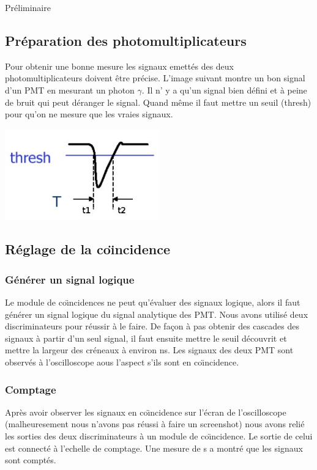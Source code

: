 \documentclass[a4paper,11pt,liststotocnumbered,bibtotocnumbered]{scrartcl}
\begin{document}
 \begin{section}{Préliminaire}
  \subsection{Préparation des photomultiplicateurs}
   Pour obtenir une bonne mesure les signaux emettés des deux photomultiplicateurs doivent être précise. L'image suivant montre un bon signal d'un PMT en mesurant un photon $\gamma$. Il n' y a qu'un signal bien défini et à peine de bruit qui peut déranger le signal. Quand même il faut mettre un seuil (thresh) pour qu'on ne mesure que les vraies signaux.  
   \begin{center}
    \includegraphics[width=0.5\textwidth]{bilder/pmtpuls.jpg}
   \end{center}
  

  \subsection{Réglage de la co\"{\i}ncidence}
   \subsubsection{Générer un signal logique}
    Le module de co\"{\i}ncidences ne peut qu'évaluer des signaux logique, alors il faut générer un signal logique du signal analytique des PMT. Nous avons utilisé deux discriminateurs pour réussir à le faire. De fa\c con à pas obtenir des cascades des signaux à partir d'un seul signal, il faut ensuite mettre le seuil découvrit et mettre la largeur des créneaux à environ \unit[600]{ns}. Les signaux des deux PMT sont observés à l'oscilloscope aous l'aspect s'ils sont en co\"{\i}ncidence.
   
  
   \subsubsection{Comptage}
    Après avoir observer les signaux en co\"{\i}ncidence sur l'écran de l'oscilloscope (malheuresement nous n'avons pas réussi à faire un screenshot) nous avons relié les sorties des deux discriminateurs à un module de co\"{\i}ncidence. Le sortie de celui est connecté à l'echelle de comptage. Une mesure de \unit[10]{s} a montré que les signaux sont comptés.
   

\end{section}
\end{document}
